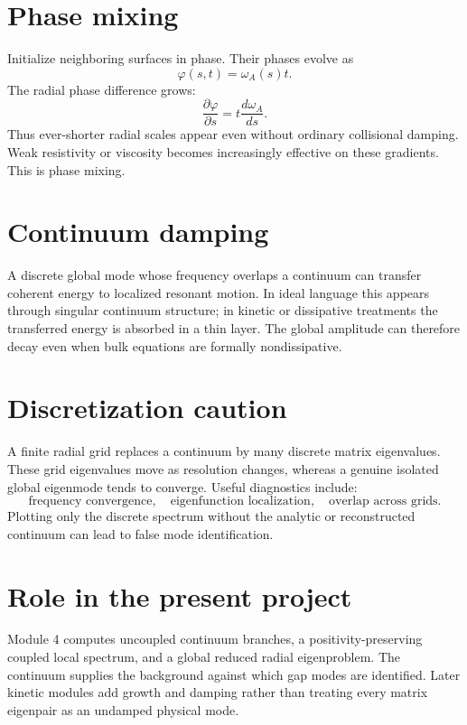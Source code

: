 \documentclass[11pt]{article}
\begin{document}
\section{Phase mixing}

Initialize neighboring surfaces in phase. Their phases evolve as
\begin{equation}
\varphi(s,t)=\omega_A(s)t.
\end{equation}
The radial phase difference grows:
\begin{equation}
\frac{\partial\varphi}{\partial s}
=t\frac{d\omega_A}{ds}.
\end{equation}
Thus ever-shorter radial scales appear even without ordinary collisional damping. Weak resistivity or viscosity becomes increasingly effective on these gradients. This is phase mixing.


\section{Continuum damping}

A discrete global mode whose frequency overlaps a continuum can transfer coherent energy to localized resonant motion. In ideal language this appears through singular continuum structure; in kinetic or dissipative treatments the transferred energy is absorbed in a thin layer. The global amplitude can therefore decay even when bulk equations are formally nondissipative.


\section{Discretization caution}

A finite radial grid replaces a continuum by many discrete matrix eigenvalues. These grid eigenvalues move as resolution changes, whereas a genuine isolated global eigenmode tends to converge. Useful diagnostics include:
\begin{equation}
\text{frequency convergence},\quad
\text{eigenfunction localization},\quad
\text{overlap across grids}.
\end{equation}
Plotting only the discrete spectrum without the analytic or reconstructed continuum can lead to false mode identification.


\section{Role in the present project}

Module 4 computes uncoupled continuum branches, a positivity-preserving coupled local spectrum, and a global reduced radial eigenproblem. The continuum supplies the background against which gap modes are identified. Later kinetic modules add growth and damping rather than treating every matrix eigenpair as an undamped physical mode.
\end{document}
